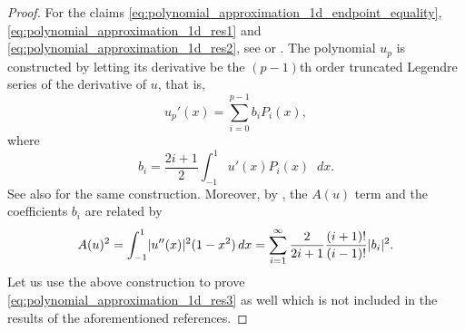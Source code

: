 \documentclass[english, 12pt, a4paper, sci, utf8, a-2b, online]{aaltothesis}
\theoremstyle{definition}
\theoremstyle{plain}
\DeclarePairedDelimiter\abs{\lvert}{\rvert}
\newcommand*\diff{\mathop{}\!d}
\numberwithin{equation}{section}
\begin{document}
\begin{proof}
    For the claims \eqref{eq:polynomial_approximation_1d_endpoint_equality},
    \eqref{eq:polynomial_approximation_1d_res1} and \eqref{eq:polynomial_approximation_1d_res2},
    see \cite[Lemma~3.3]{babuskasuri1987} or \cite{guibabuska1986}.
    The polynomial $u_p$ is constructed by letting its derivative be the
    $(p-1)$th order truncated Legendre series of the derivative of $u$, that is,
    \begin{equation*}
        u_p'(x) = \sum_{i=0}^{p-1} b_i P_i(x),
    \end{equation*}
    where
    \begin{equation*}
        b_i = \frac{2i+1}{2} \int_{-1}^{1} u'(x) P_i(x) \diff x.
    \end{equation*}
    See also \cite[Theorem~3.14 on p.~73]{schwab1998} for the same construction.
    Moreover, by \cite[Theorem 3.10 on p.\ 71]{schwab1998},
    the $A(u)$ term and the coefficients $b_i$ are related by
    \begin{equation}
        \label{eq:polynomial_approximation_1d_A}
        A(u)^2
        = \int_{-1}^{1} \abs{u''(x)}^2 (1-x^2) \diff x
        = \sum_{i=1}^{\infty} \frac{2}{2i+1} \frac{(i+1)!}{(i-1)!} \abs{b_i}^2.
    \end{equation}
    Let us use the above construction to prove \eqref{eq:polynomial_approximation_1d_res3}
    as well which is not included in the results of the aforementioned references.


\end{proof}
\end{document}

